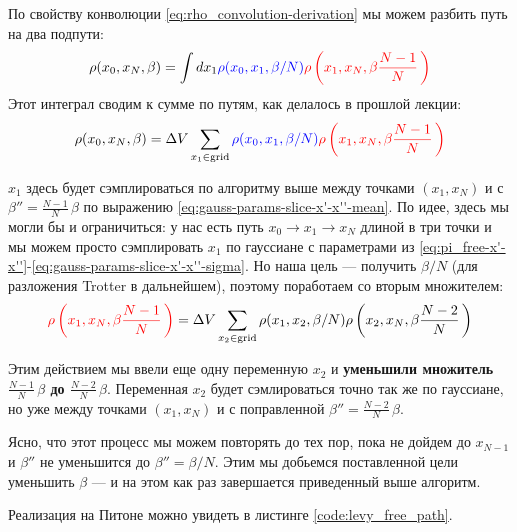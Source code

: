 \begin{lecture}
    По свойству конволюции \eqref{eq:rho_convolution-derivation} мы можем разбить путь на два подпути:
    \begin{equation}
        \label{eq:levy_proof-path_split-x_1}
        \rho (x_0, x_N, \beta) = \int dx_1 {\color{blue} \rho(x_0, x_1, \beta /N)} {\color{red} \rho\left(x_1, x_N, \beta \frac{N-1}{N}\,\right)}
    \end{equation}
    Этот интеграл сводим к сумме по путям, как делалось в прошлой лекции:
    \begin{equation}
        \label{eq:levy_proof-path_split-x_1-discrete}
        \rho(x_0, x_N, \beta) = \Delta V \sum\limits_{x_1 \in \text{grid}}^{} {\color{blue} \rho(x_0, x_1, \beta /N)} {\color{red} \rho\left(x_1, x_N, \beta \frac{N-1}{N}\,\right)}
    \end{equation}

    $x_1$ здесь будет сэмплироваться по алгоритму выше между точками $(x_1, x_N)$ и с $\beta'' = \frac{N-1}{N}\,\beta$ по выражению \eqref{eq:gauss-params-slice-x'-x''-mean}.
    По идее, здесь мы могли бы и ограничиться: у нас есть путь $x_0 \rightarrow x_1 \rightarrow x_N$ длиной в три точки и мы можем просто сэмплировать $x_1$ по гауссиане с параметрами из \eqref{eq:pi_free-x'-x''}-\eqref{eq:gauss-params-slice-x'-x''-sigma}.
    Но наша цель --- получить $\beta /N$ (для разложения Trotter в дальнейшем), поэтому поработаем со вторым множителем:
    \begin{equation}
        \label{eq:levy_proof-recursive_decomposition}
        {\color{red} \rho\left(x_1, x_N, \beta \frac{N-1}{N}\,\right)} =
        \Delta V \sum\limits_{x_2 \in \text{grid}}^{} \rho(x_1, x_2, \beta /N) \rho\left( x_2, x_N, \beta \frac{N-2}{N}\, \right) 
    \end{equation}

    Этим действием мы ввели еще одну переменную $x_2$ и \textbf{уменьшили множитель $\frac{N-1}{N}\,\beta$ до $\frac{N-2}{N}\,\beta$}.
    Переменная $x_2$ будет сэмлироваться точно так же по гауссиане, но уже между точками $(x_1, x_N)$ и с поправленной $\beta'' = \frac{N-2}{N}\, \beta$.

    Ясно, что этот процесс мы можем повторять до тех пор, пока не дойдем до $x_{N-1}$ и $\beta''$ не уменьшится до $\beta'' = \beta /N$.
    Этим мы добьемся поставленной цели уменьшить $\beta$ --- и на этом как раз завершается приведенный выше алгоритм.

    Реализация на Питоне можно увидеть в листинге \ref{code:levy_free_path}.


\end{lecture}
